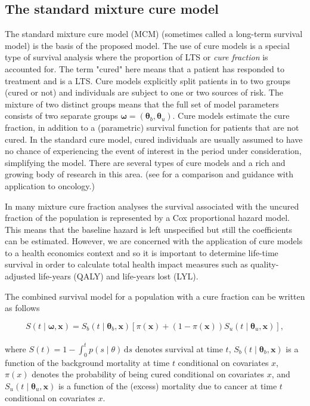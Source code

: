 \documentclass[AMA,STIX1COL]{WileyNJD-v2}
\begin{document}
\subsection{The standard mixture cure model} \label{section:basic_model}

The standard mixture cure model (MCM) (sometimes called a long-term survival model) is the basis of the proposed model.
The use of cure models is a special type of survival analysis where the proportion of LTS or {\it cure fraction} is accounted for.
The term "cured" here means that a patient has responded to treatment and is a LTS.
Cure models explicitly split patients in to two groups (cured or not) and individuals are subject to one or two sources of risk.
The mixture of two distinct groups means that the full set of model parameters consists of two separate groups $\bm\omega = (\bm\theta_b, \bm\theta_u)$.
Cure models estimate the cure fraction, in addition to a (parametric) survival function for patients that are not cured.
In the standard cure model, cured individuals are usually assumed to have no chance of experiencing the event of interest in the period under consideration, simplifying the model.
There are several types of cure models and a rich and growing body of research in this area.
(see \citep{Yu2013} for a comparison and guidance with application to oncology.)

In many mixture cure fraction analyses the survival associated with the uncured fraction of the population is represented by a Cox proportional hazard model.
This means that the baseline hazard is left unspecified but still the coefficients can be estimated.
However, we are concerned with the application of cure models to a health economics context and so it is important to determine life-time survival in order to calculate total health impact measures such as quality-adjusted life-years (QALY) and life-years lost (LYL).



The combined survival model for a population with a cure fraction can be written as follows

\begin{equation}
\label{eqn:mcm}
S(t \mid \bm\omega, \bm{x}) = S_b(t \mid \bm\theta_b, \bm{x}) \left[\pi(\bm{x}) + (1 - \pi(\bm{x})) S_u(t \mid \bm\theta_u, \bm{x}) \right],
\end{equation}
\\
\noindent
where $S(t) = 1 \!-\! \int_0^t p(s \mid \theta)\, \text{d}s$ denotes survival at time $t$,
$S_b(t \mid \bm\theta_b, \bm{x})$ is a function of the background mortality at time $t$ conditional on covariates $x$,
$\pi(x)$ denotes the probability of being cured conditional on covariates $x$,
and $S_u(t \mid \bm\theta_u, \bm{x})$ is a function of the (excess) mortality due to cancer at time $t$ conditional on covariates $x$.
\end{document}
